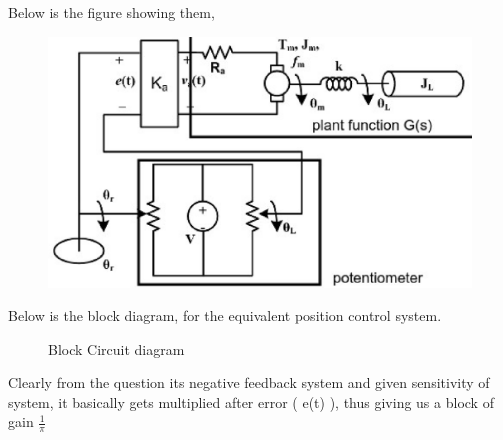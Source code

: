 \begin{enumerate}[label=\thesection.\arabic*.,ref=\thesection.\theenumi]
Below is the figure showing them,\newline
\begin{figure}[!ht]
    \includegraphics[width=\columnwidth]{./figs/ee18btech11019_3.eps}
  \caption{}
  \label{fig:ee18btech11019_fig3}
\end{figure}
Below is the block diagram, for the equivalent position control system.\newline
\begin{figure}[!ht]
    \begin{center}
		
		\resizebox{\columnwidth}{!}{}
	\end{center}
\caption{Block Circuit diagram}
\label{fig:circuit_diagram}
\end{figure}
Clearly from the question its negative feedback system and given sensitivity of system, it basically gets multiplied after error ( e(t) ), thus giving us a block of gain $\frac{1}{\pi}$\newline


\end{enumerate}

